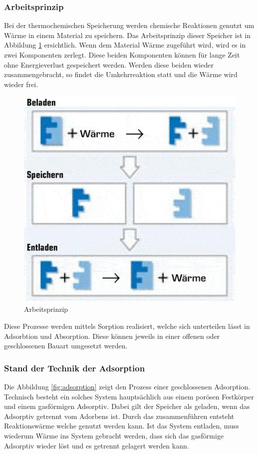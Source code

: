 \documentclass[11pt,a4paper]{scrartcl}
\begin{document}
\subsubsection{Arbeitsprinzip}
Bei der thermochemischen Speicherung werden chemische Reaktionen genutzt um
Wärme in einem Material zu speichern. Das Arbeitsprinzip dieser Speicher ist in
Abbildung \ref{fig:ladenspeichernentladens} ersichtlich. Wenn dem Material Wärme
zugeführt wird, wird es in zwei Komponenten zerlegt. Diese beiden Komponenten
können für lange Zeit ohne Energieverlust gespeichert werden. Werden diese
beiden wieder zusammengebracht, so findet die Umkehrreaktion statt und die Wärme
wird wieder frei.

\begin{figure}[h!]
\begin{center}
\includegraphics[scale=0.6]{images/ladenspeichernentladen.jpg}
\caption{Arbeitsprinzip \cite{ladenspeichernentladen}}
\label{fig:ladenspeichernentladens}
\end{center}
\end{figure}

Diese Prozesse werden mittels Sorption realisiert, welche sich unterteilen lässt
in Adsorbtion und Absorption. Diese können jeweils in einer offenen oder
geschlossenen Bauart umgesetzt werden.

\subsubsection{Stand der Technik der Adsorption}
Die Abbildung \ref{fig:adsorption} zeigt den Prozess einer geschlossenen
Adsorption. Technisch besteht ein solches System hauptsächlich aus einem porösen
Festkörper und einem gasförmigen Adsorptiv. Dabei gilt der Speicher als geladen,
wenn das Adsorptiv getrennt vom Adorbens ist. Durch das zusammenführen entsteht
Reaktionswärme welche genutzt werden kann. Ist das System entladen, muss
wiederum Wärme ins System gebracht werden, dass sich das gasförmige Adsorptiv
wieder löst und es getrennt gelagert werden kann.
\end{document}
